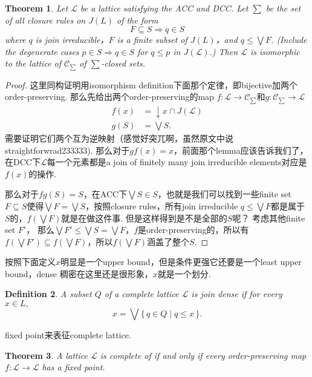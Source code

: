 \documentclass{article}
\newtheorem{theorem}{Theorem}[section]
\newtheorem{definition}[theorem]{Definition}
\newcommand*{\xfunc}[4]{{#2}\colon{#3}{#1}{#4}}
\newcommand*{\func}[3]{\xfunc{\to}{#1}{#2}{#3}}
\newcommand\Set[2]{\{\,#1\mid#2\,\}} %
\newcommand\lattice{\mathcal{L}}
\begin{document}
\begin{theorem}
\rm Let $\lattice$ be a lattice satisfying the ACC and DCC. Let $\sum$ be the set of all closure rules on $J(L)$ of the form
$$
F \subseteq S \Rightarrow q \in S
$$
where $q$ is join irreducible，$F$ is a finite subset of $J(L)$，and $q \leq \bigvee F$. (Include the degenerate cases $p \in S \Rightarrow q \in S$ for $q \leq p$ in $J(\lattice)$.) Then $\lattice$ is isomorphic to the lattice of $\mathcal{C}_{\sum}$ of $\sum$-closed sets.
\end{theorem}

\begin{proof}
这里同构证明用isomorphism definition下面那个定律，即bijective加两个order-preserving. 那么先给出两个order-preserving的map $\func{f}{\lattice}{\mathcal{C}_{\sum}}$和$\func{g}{\mathcal{C}_{\sum}}{\lattice}$
$$
\begin{aligned}
f(x) &= \downarrow x \cap J(\lattice)\\
g(S) &= \bigvee S.
\end{aligned}
$$
需要证明它们两个互为逆映射（感觉好突兀啊，虽然原文中说straightforwrad233333). 那么对于$gf(x) = x$，前面那个lemma应该告诉我们了，在DCC下$\lattice$每一个元素都是a join of finitely many join irreducible elements对应是$f(x)$的操作. 

那么对于$fg(S) = S$，在ACC下$\bigvee S \in S$，也就是我们可以找到一些finite set $F \subseteq S$使得$\bigvee F = \bigvee S$，按照closure rules，所有join irreducible $q \leq \bigvee F$都是属于$S$的，$f(\bigvee F)$就是在做这件事. 但是这样得到是不是全部的$S$呢？ 考虑其他finite set $F'$， 那么$\bigvee F' \leq \bigvee S = \bigvee F$，$f$是order-preserving的，所以有$f(\bigvee F') \subseteq f(\bigvee F)$，所以$f(\bigvee F)$涵盖了整个$S$.
\end{proof}

{\color{blue} 按照下面定义$x$明显是一个upper bound，但是条件更强它还要是一个least upper bound，dense 稠密在这里还是很形象，$x$就是一个划分}.

\begin{definition}
\rm A subset $Q$ of a complete lattice $\lattice$ is {\color{red} join dense} if for every $x \in L,$
$$
x = \bigvee\Set{q \in Q}{q \leq x}.
$$
\end{definition}

{\color{blue} fixed point来表征complete lattice}.

\begin{theorem}
\rm A lattice $\lattice$ is complete of if and only if every order-preserving map $\func{f}{\lattice}{\lattice}$ has a fixed point.
\end{theorem}
\end{document}
